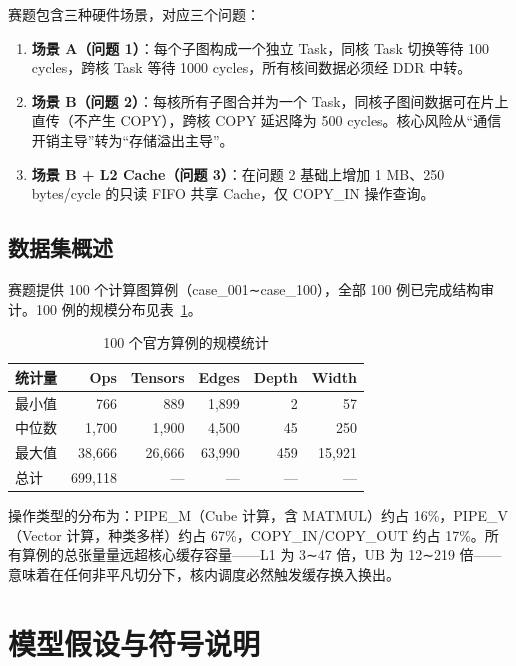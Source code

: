 \documentclass[bwprint]{gmcmthesis}
\begin{document}
赛题包含三种硬件场景，对应三个问题：
\begin{enumerate}
  \item \textbf{场景 A（问题 1）}：每个子图构成一个独立 Task，同核 Task 切换等待 100 cycles，跨核 Task 等待 1000 cycles，所有核间数据必须经 DDR 中转。
  \item \textbf{场景 B（问题 2）}：每核所有子图合并为一个 Task，同核子图间数据可在片上直传（不产生 COPY），跨核 COPY 延迟降为 500 cycles。核心风险从“通信开销主导”转为“存储溢出主导”。
  \item \textbf{场景 B + L2 Cache（问题 3）}：在问题 2 基础上增加 1 MB、250 bytes/cycle 的只读 FIFO 共享 Cache，仅 COPY\_IN 操作查询。
\end{enumerate}

\subsection{数据集概述}

赛题提供 100 个计算图算例（case\_001∼case\_100），全部 100 例已完成结构审计。100 例的规模分布见表~\ref{tab:dataset}。

\begin{table}[!h]
\centering
\caption{100 个官方算例的规模统计}
\label{tab:dataset}
\small
\begin{tabular}{lrrrrr}
\toprule
\textbf{统计量} & \textbf{Ops} & \textbf{Tensors} & \textbf{Edges} & \textbf{Depth} & \textbf{Width} \\
\midrule
最小值  & 766   & 889   & 1,899   & 2   & 57 \\
中位数  & 1,700 & 1,900 & 4,500   & 45  & 250 \\
最大值  & 38,666 & 26,666 & 63,990 & 459 & 15,921 \\
总计    & 699,118 & ---  & ---    & --- & --- \\
\bottomrule
\end{tabular}
\end{table}

操作类型的分布为：PIPE\_M（Cube 计算，含 MATMUL）约占 16\%，PIPE\_V（Vector 计算，种类多样）约占 67\%，COPY\_IN/COPY\_OUT 约占 17\%。所有算例的总张量量远超核心缓存容量——L1 为 3∼47 倍，UB 为 12∼219 倍——意味着在任何非平凡切分下，核内调度必然触发缓存换入换出。

\section{模型假设与符号说明}
\end{document}
